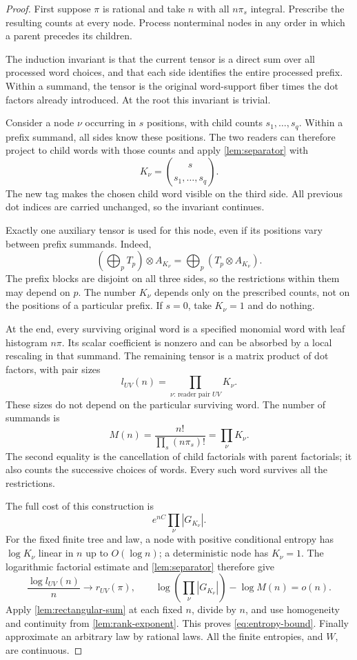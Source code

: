 \documentclass[11pt]{article}
\numberwithin{equation}{section}
\theoremstyle{definition}
\theoremstyle{remark}
\begin{document}
\begin{proof}
First suppose \(\pi\) is rational and take \(n\) with all \(n\pi_s\)
integral.  Prescribe the resulting counts at every node.
Process nonterminal nodes in any order in which a parent precedes
its children.

The induction invariant is that the current tensor is a direct sum
over all processed word choices, and that each side identifies the
entire processed prefix.  Within a summand, the tensor is the original
word-support fiber times the dot factors already introduced.
At the root this invariant is trivial.

Consider a node \(\nu\) occurring in \(s\) positions, with child counts
\(s_1,\ldots,s_q\).
Within a prefix summand, all sides know these positions.
The two readers can therefore project to child words with those counts
and apply \cref{lem:separator} with
\[
 K_\nu=\binom{s}{s_1,\ldots,s_q}.
\]
The new tag makes the chosen child word visible on the third side.
All previous dot indices are carried unchanged, so the invariant
continues.

Exactly one auxiliary tensor is used for this node, even if its
positions vary between prefix summands.
Indeed,
\[
 \left(\bigoplus_p T_p\right)\otimes A_{K_\nu}
   =\bigoplus_p(T_p\otimes A_{K_\nu}).
\]
The prefix blocks are disjoint on all three sides, so the restrictions
within them may depend on \(p\).
The number \(K_\nu\) depends only on the prescribed counts, not on
the positions of a particular prefix.
If \(s=0\), take \(K_\nu=1\) and do nothing.

At the end, every surviving original word is a specified monomial
word with leaf histogram \(n\pi\).
Its scalar coefficient is nonzero and can be absorbed by a local
rescaling in that summand.
The remaining tensor is a matrix product of dot factors, with pair sizes
\[
 l_{UV}(n)=\prod_{\nu:\,\text{reader pair }UV}K_\nu.
\]
These sizes do not depend on the particular surviving word.
The number of summands is
\begin{equation}\label{eq:multinomial-telescope}
 M(n)=\frac{n!}{\prod_s(n\pi_s)!}=\prod_\nu K_\nu.
\end{equation}
The second equality is the cancellation of child factorials with
parent factorials; it also counts the successive choices of words.
Every such word survives all the restrictions.

The full cost of this construction is
\[
 e^{nC}\prod_\nu |G_{K_\nu}|.
\]
For the fixed finite tree and law, a node with positive conditional
entropy has \(\log K_\nu\) linear in \(n\) up to \(O(\log n)\);
a deterministic node has \(K_\nu=1\).
The logarithmic factorial estimate and
\cref{lem:separator} therefore give
\[
 \frac{\log l_{UV}(n)}n\longrightarrow r_{UV}(\pi),\qquad
 \log\!\left(\prod_\nu|G_{K_\nu}|\right)-\log M(n)=o(n).
\]
Apply \cref{lem:rectangular-sum} at each fixed \(n\), divide by \(n\),
and use homogeneity and continuity from \cref{lem:rank-exponent}.
This proves \eqref{eq:entropy-bound}.
Finally approximate an arbitrary law by rational laws.
All the finite entropies, and \(W\), are continuous.
\end{proof}
\end{document}

